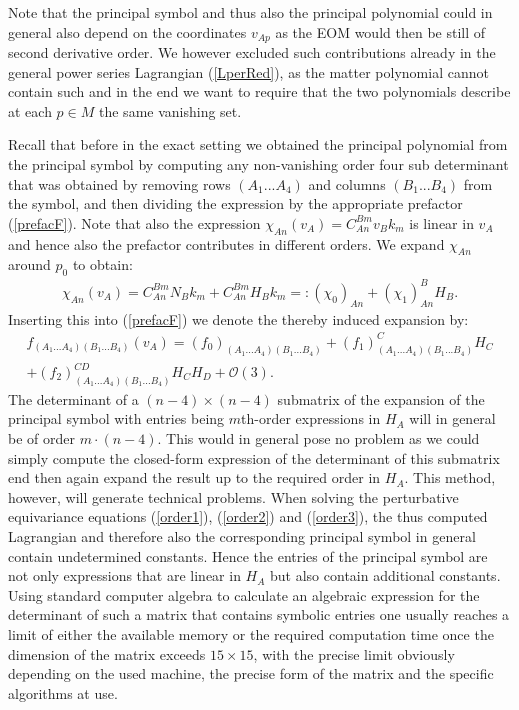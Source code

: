 Note that the principal symbol and thus also the principal polynomial could in general also depend on the coordinates $v_{Ap}$ as the EOM would then be still of second derivative order. We however excluded such contributions already in the general power series Lagrangian (\ref{LperRed}),  as the matter polynomial cannot contain such and in the end we want to require that the two polynomials describe at each $p \in M$ the same vanishing set. 

Recall that before in the exact setting we obtained the principal polynomial from the principal symbol by computing any non-vanishing order four sub determinant that was obtained by removing rows $(A_1...A_4)$ and columns $(B_1...B_4)$ from the symbol, and then dividing the expression by the appropriate prefactor (\ref{prefacF}).
Note that also the expression $\chi_{An}(v_A) = C_{An}^{Bm}v_Bk_m$ is linear in $v_A$ and hence also the prefactor contributes in different orders. We expand $\chi_{An}$ around $p_0$ to obtain:
\begin{align}
\chi_{An}(v_A) =  C^{Bm}_{An} N_B k_m + C^{Bm}_{An} H_B k_m =: (\chi_0)_{An} + (\chi_1)^B_{An}H_B.
\end{align}
Inserting this into (\ref{prefacF}) we denote the thereby induced expansion by:
\begin{multline}\label{prefacExp}
    f_{(A_1...A_4)(B_1...B_4)}(v_A) = (f_0)_{(A_1...A_4)(B_1...B_4)} + (f_1)^C_{(A_1...A_4)(B_1...B_4)}H_C\\ + (f_2)^{CD}_{(A_1...A_4)(B_1...B_4)}H_CH_D
    + \mathcal{O}(3).
\end{multline}
The determinant of a $(n-4) \times (n-4)$ submatrix of the expansion of the principal symbol with entries being $m$th-order expressions in $H_A$ will in general be of order $m\cdot(n-4)$. This would in general pose no problem as we could simply compute the closed-form expression of the determinant of this submatrix end then again expand the result up to the required order in $H_A$. This method, however, will generate technical problems. When solving the perturbative equivariance equations (\ref{order1}), (\ref{order2}) and (\ref{order3}), the thus computed Lagrangian and therefore also the corresponding principal symbol in general contain undetermined constants. Hence the entries of the principal symbol are not only expressions that are linear in $H_A$ but also contain additional constants. Using standard computer algebra to calculate an algebraic expression for the determinant of such a matrix that contains symbolic entries one usually reaches a limit of either the available memory or the required computation time once the dimension of the matrix exceeds $15 \times 15$, with the precise limit obviously depending on the used machine, the precise form of the matrix and the specific algorithms at use. 

